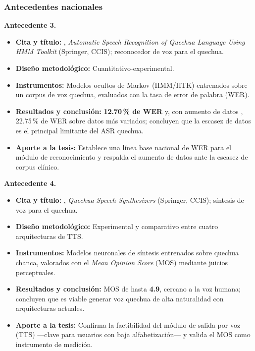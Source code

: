 \documentclass[12pt,a4paper]{article}
\newenvironment{bloqueObsDos}{\par\color{verdeOK}}{\par}
\begin{document}
\subsubsection{Antecedentes nacionales}
\begin{bloqueObsDos}
\noindent\textbf{Antecedente 3.}
\begin{itemize}\setlength{\itemsep}{1pt}
  \item \textbf{Cita y t{\'i}tulo:} \textcite{Zevallos202061}, \emph{Automatic Speech Recognition of Quechua Language Using HMM Toolkit} (Springer, CCIS); reconocedor de voz para el quechua.
  \item \textbf{Dise{\~n}o metodol{\'o}gico:} Cuantitativo-experimental.
  \item \textbf{Instrumentos:} Modelos ocultos de Markov (HMM/HTK) entrenados sobre un corpus de voz quechua, evaluados con la tasa de error de palabra (WER).
  \item \textbf{Resultados y conclusi{\'o}n:} \textbf{12.70\,\% de WER} y, con aumento de datos \parencite{Zevallos20223518}, 22.75\,\% de WER sobre datos m{\'a}s variados; concluyen que la escasez de datos es el principal limitante del ASR quechua.
  \item \textbf{Aporte a la tesis:} Establece una l{\'i}nea base nacional de WER para el m{\'o}dulo de reconocimiento y respalda el aumento de datos ante la escasez de corpus cl{\'i}nico.
\end{itemize}

\noindent\textbf{Antecedente 4.}
\begin{itemize}\setlength{\itemsep}{1pt}
  \item \textbf{Cita y t{\'i}tulo:} \textcite{HuamanCuro2026}, \emph{Quechua Speech Synthesizers} (Springer, CCIS); s{\'i}ntesis de voz para el quechua.
  \item \textbf{Dise{\~n}o metodol{\'o}gico:} Experimental y comparativo entre cuatro arquitecturas de TTS.
  \item \textbf{Instrumentos:} Modelos neuronales de s{\'i}ntesis entrenados sobre quechua chanca, valorados con el \emph{Mean Opinion Score} (MOS) mediante juicios perceptuales.
  \item \textbf{Resultados y conclusi{\'o}n:} MOS de hasta \textbf{4.9}, cercano a la voz humana; concluyen que es viable generar voz quechua de alta naturalidad con arquitecturas actuales.
  \item \textbf{Aporte a la tesis:} Confirma la factibilidad del m{\'o}dulo de salida por voz (TTS) ---clave para usuarios con baja alfabetizaci{\'o}n--- y valida el MOS como instrumento de medici{\'o}n.
\end{itemize}


\end{bloqueObsDos}
\end{document}
